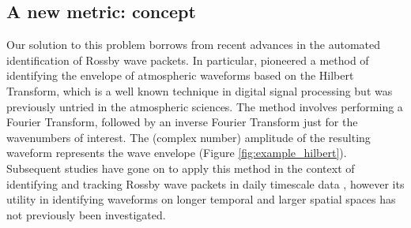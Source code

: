 \subsection{A new metric: concept}

Our solution to this problem borrows from recent advances in the automated identification of Rossby wave packets. In particular, \citet{Zimin2003} pioneered a method of identifying the envelope of atmospheric waveforms based on the Hilbert Transform, which is a well known technique in digital signal processing but was previously untried in the atmospheric sciences. The method involves performing a Fourier Transform, followed by an inverse Fourier Transform just for the wavenumbers of interest. The (complex number) amplitude of the resulting waveform represents the wave envelope (Figure \cref{fig:example_hilbert}). Subsequent studies have gone on to apply this method in the context of identifying and tracking Rossby wave packets in daily timescale data \citep{Glatt2014,Souders2014a}, however its utility in identifying waveforms on longer temporal and larger spatial spaces has not previously been investigated.
